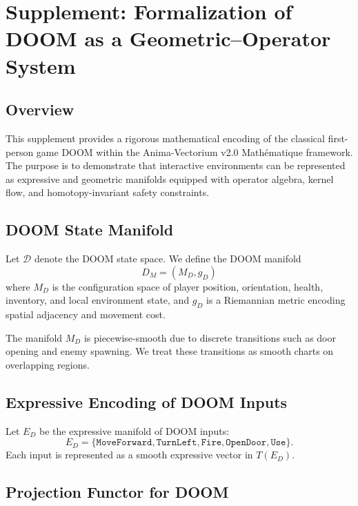 \chapter{Supplement: Formalization of DOOM as a Geometric–Operator System}

\section{Overview}

This supplement provides a rigorous mathematical encoding of the classical
first-person game DOOM within the Anima-Vectorium v2.0 Mathématique framework.
The purpose is to demonstrate that interactive environments can be represented
as expressive and geometric manifolds equipped with operator algebra, kernel
flow, and homotopy-invariant safety constraints.

\section{DOOM State Manifold}

\begin{definition}
Let $\mathcal{D}$ denote the DOOM state space. We define the DOOM manifold
\[
D_M = (M_D, g_D)
\]
where $M_D$ is the configuration space of player position, orientation,
health, inventory, and local environment state, and $g_D$ is a Riemannian
metric encoding spatial adjacency and movement cost.
\end{definition}

The manifold $M_D$ is piecewise-smooth due to discrete transitions such as
door opening and enemy spawning. We treat these transitions as smooth charts
on overlapping regions.

\section{Expressive Encoding of DOOM Inputs}

\begin{definition}
Let $E_D$ be the expressive manifold of DOOM inputs:
\[
E_D = \{ \texttt{MoveForward}, \texttt{TurnLeft}, \texttt{Fire}, 
\texttt{OpenDoor}, \texttt{Use} \}.
\]
Each input is represented as a smooth expressive vector in $T(E_D)$.
\end{definition}

\section{Projection Functor for DOOM}

